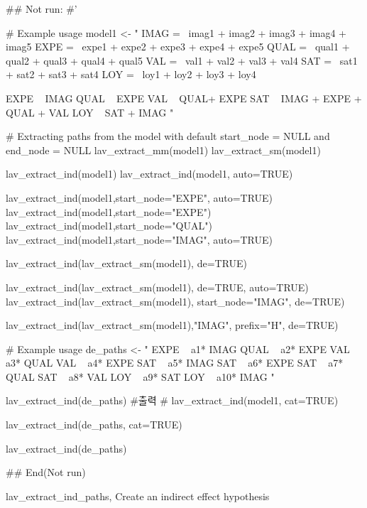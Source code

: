 \documentclass[a4paper]{book}
\begin{document}
\begin{Examples}
\begin{ExampleCode}


## Not run: 
#'

# Example usage
model1 <- "
IMAG =~ imag1 + imag2 + imag3 + imag4 + imag5
EXPE =~ expe1 + expe2 + expe3 + expe4 + expe5
QUAL =~ qual1 + qual2 + qual3 + qual4 + qual5
VAL =~ val1 + val2 + val3 + val4
SAT =~ sat1 + sat2 + sat3 + sat4
LOY =~ loy1 + loy2 + loy3 + loy4

EXPE ~ IMAG
QUAL ~ EXPE
VAL ~  QUAL+ EXPE
SAT ~ IMAG + EXPE + QUAL + VAL
LOY ~ SAT + IMAG
"


# Extracting paths from the model with default start_node = NULL and end_node = NULL
lav_extract_mm(model1) %
lav_extract_sm(model1) %

lav_extract_ind(model1)%
lav_extract_ind(model1, auto=TRUE)%

lav_extract_ind(model1,start_node="EXPE", auto=TRUE)%
lav_extract_ind(model1,start_node="EXPE")%
lav_extract_ind(model1,start_node="QUAL")%
lav_extract_ind(model1,start_node="IMAG", auto=TRUE)%

lav_extract_ind(lav_extract_sm(model1), de=TRUE) %

lav_extract_ind(lav_extract_sm(model1), de=TRUE, auto=TRUE)%
lav_extract_ind(lav_extract_sm(model1), start_node="IMAG", de=TRUE) %

lav_extract_ind(lav_extract_sm(model1),"IMAG", prefix="H", de=TRUE) %

# Example usage
de_paths <- "
EXPE  ~ a1* IMAG
QUAL  ~ a2* EXPE
VAL  ~ a3* QUAL
VAL  ~ a4* EXPE
SAT  ~ a5* IMAG
SAT  ~ a6* EXPE
SAT  ~ a7* QUAL
SAT  ~ a8* VAL
LOY  ~ a9* SAT
LOY  ~ a10* IMAG
"

lav_extract_ind(de_paths)
#출력
#  lav_extract_ind(model1, cat=TRUE)

lav_extract_ind(de_paths, cat=TRUE)

lav_extract_ind(de_paths)%

## End(Not run)

\end{ExampleCode}
\end{Examples}
%
\begin{Description}
lav\_extract\_ind\_paths, Create an indirect effect hypothesis
\end{Description}
\end{document}
